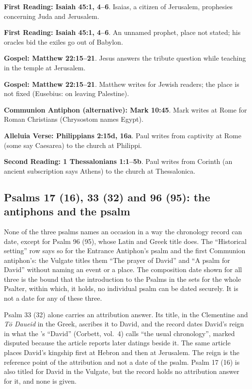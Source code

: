 \noindent\textbf{First Reading: Isaiah 45:1, 4--6}. Isaias, a citizen of Jerusalem, prophesies concerning Juda and Jerusalem.

\noindent\textbf{First Reading: Isaiah 45:1, 4--6}. An unnamed prophet, place not stated; his oracles bid the exiles go out of Babylon.

\noindent\textbf{Gospel: Matthew 22:15--21}. Jesus answers the tribute question while teaching in the temple at Jerusalem.

\noindent\textbf{Gospel: Matthew 22:15--21}. Matthew writes for Jewish readers; the place is not fixed (Eusebius: on leaving Palestine).

\noindent\textbf{Communion Antiphon (alternative): Mark 10:45}. Mark writes at Rome for Roman Christians (Chrysostom names Egypt).

\noindent\textbf{Alleluia Verse: Philippians 2:15d, 16a}. Paul writes from captivity at Rome (some say Caesarea) to the church at Philippi.

\noindent\textbf{Second Reading: 1 Thessalonians 1:1--5b}. Paul writes from Corinth (an ancient subscription says Athens) to the church at Thessalonica.


\subsection{Psalms 17 (16), 33 (32) and 96 (95): the antiphons and the psalm}
\label{sec:date-psalms}

None of the three psalms names an occasion in a way the chronology record can
date, except for Psalm 96 (95), whose Latin and Greek title does. The
``Historical setting'' row says so for the Entrance Antiphon's psalm and the
first Communion antiphon's: the Vulgate titles them ``The prayer of David''
and ``A psalm for David'' without naming an event or a place. The composition
date shown for all three is the bound that the introduction to the Psalms in
the  sets for the whole Psalter,
within which, it holds, no individual psalm can be dated securely. It is not a
date for any of these three.

Psalm 33 (32) alone carries an attribution answer. Its title,  in the Clementine and \textit{T\=o Daueid} in the Greek, ascribes it to
David, and the record dates David's reign in what the 's ``David'' (Corbett, vol.~4) calls ``the usual chronology'',
marked disputed because the article reports later datings beside it. The same
article places David's kingship first at Hebron and then at Jerusalem. The
reign is the reference point of the attribution and not a date of the psalm.
Psalm 17 (16) is also titled for David in the Vulgate, but the record holds no
attribution answer for it, and none is given.

